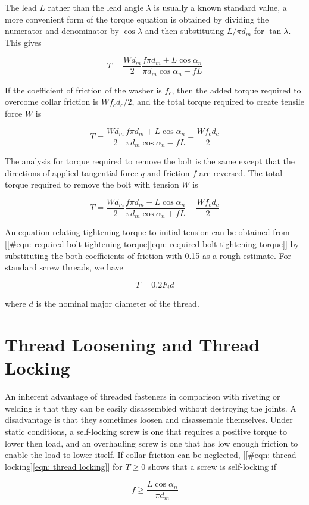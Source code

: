 \documentclass[a4paper,openany,12pt]{book}
\begin{document}
{{The lead \(L\) rather than the lead angle \(\lambda\) is usually a known
standard value, a more convenient form of the torque equation is
obtained by dividing the numerator and denominator by \(\cos \lambda\) and
then substituting \(L/\pi d_m\) for \(\tan \lambda\). This gives

$$T = \frac{Wd_m}{2}\frac{f\pi d_m + L\cos \alpha_n}{\pi d_m\cos \alpha_n - fL}$$

If the coefficient of friction of the washer is \(f_c\), then the added
torque required to overcome collar friction is \(Wf_cd_c/2\), and the
total torque required to create tensile force \(W\) is

$$T = \frac{Wd_m}{2}\frac{f\pi d_m + L\cos \alpha_n}{\pi d_m\cos \alpha_n - fL} + \frac{Wf_cd_c}{2}$$

The analysis for torque required to remove the bolt is the same except
that the directions of applied tangential force \(q\) and friction \(f\) are
reversed. The total torque required to remove the bolt with tension \(W\)
is

$$T = \frac{Wd_m}{2}\frac{f\pi d_m - L\cos \alpha_n}{\pi d_m\cos \alpha_n + fL} + \frac{Wf_cd_c}{2}$$

An equation relating tightening torque to initial tension can be
obtained from
[[\#eqn: required bolt tightening torque]\ref{eqn: required bolt tightening torque}]
by substituting the both coefficients of friction with 0.15 as a rough
estimate. For standard screw threads, we have

$$T = 0.2F_id$$

where \(d\) is the nominal major diameter of the thread.

\section{Thread Loosening and Thread Locking}
\label{thread-loosening-and-thread-locking}
An inherent advantage of threaded fasteners in comparison with riveting
or welding is that they can be easily disassembled without destroying
the joints. A disadvantage is that they sometimes loosen and disassemble
themselves. Under static conditions, a self-locking screw is one that
requires a positive torque to lower then load, and an overhauling screw
is one that has low enough friction to enable the load to lower itself.
If collar friction can be neglected,
[[\#eqn: thread locking]\ref{eqn: thread locking}] for \(T \geqslant 0\)
shows that a screw is self-locking if

$$f \geqslant \frac{L\cos \alpha_n}{\pi d_m}$$

}}
\end{document}

